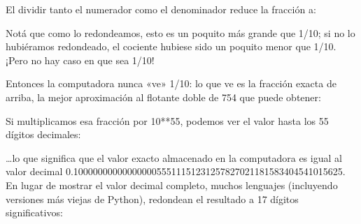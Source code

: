 \documentclass[a4,10pt,spanish]{sphinxmanual}
\begin{document}
\sphinxAtStartPar
El dividir tanto el numerador como el denominador reduce la fracción a:

\begin{sphinxVerbatim}[commandchars=\\\{\}]
    
\end{sphinxVerbatim}

\sphinxAtStartPar
Notá que como lo redondeamos, esto es un poquito más grande que 1/10; si no lo hubiéramos redondeado, el cociente hubiese sido un poquito menor que 1/10.  ¡Pero no hay caso en que sea  1/10!

\sphinxAtStartPar
Entonces la computadora nunca «ve» 1/10:  lo que ve es la fracción exacta de arriba, la mejor aproximación al flotante doble de 754 que puede obtener:

\begin{sphinxVerbatim}[commandchars=\\\{\}]
    
\end{sphinxVerbatim}

\sphinxAtStartPar
Si multiplicamos esa fracción por 10**55, podemos ver el valor hasta los 55 dígitos decimales:

\begin{sphinxVerbatim}[commandchars=\\\{\}]
        
\end{sphinxVerbatim}

\sphinxAtStartPar
…lo que significa que el valor exacto almacenado en la computadora es igual al valor decimal 0.1000000000000000055511151231257827021181583404541015625. En lugar de mostrar el valor decimal completo, muchos lenguajes (incluyendo versiones más viejas de Python), redondean el resultado a 17 dígitos significativos:

\begin{sphinxVerbatim}[commandchars=\\\{\}]
 
\end{sphinxVerbatim}
\end{document}
